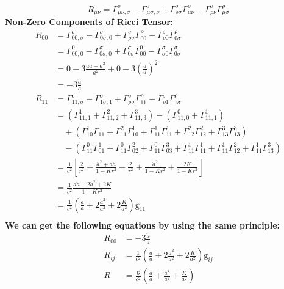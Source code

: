 \documentclass[14pt]{article}
\newcommand{\csg}[2]{\Gamma^{#1}_{#2}}
\newcommand{\csgd}[3]{\Gamma^{#1}_{#2,#3}}
\newcommand{\g}{\mathrm{g}}
\newcommand{\Ricci}[2]{\csgd{\sigma}{#1#2}{\sigma} - \csgd{\sigma}{#1\sigma}{#2} +\csg{\sigma}{\rho \sigma}\csg{\rho}{#1 #2} -\csg{\sigma}{\rho #2}\csg{\rho}{#1\sigma}}
\begin{document}
\[
R_{\mu\nu}  = \Ricci{\mu}{\nu} \tag{1.3.1}
\]
\textbf{Non-Zero Components of Ricci Tensor:}
\begin{align*}
R_{00}  &= \Ricci{0}{0}\\
        &= \csg{0}{00,0} -\csg{\sigma}{0\sigma,0}  +\csg{\sigma}{0\sigma} \csg{0}{00} - \csg{\sigma}{\sigma 0} \csg{\sigma}{0\sigma}\\ 
        &= 0-3\frac{\ddot{a}a-\dot{a}^{2}}{a^{2}}+0-3(\frac{\dot{a}}{a})^{2}\\
        &= -3\frac{\ddot{a}}{a}\tag{1.3.2}\\
R_{11}  &= \Ricci{1}{1}\\
        &= (\csg{1}{11,1}+\csg{2}{11,2}+\csg{3}{11,3})-(\csg{0}{11,0}+\csg{1}{11,1})\\
        &\quad +(\csg{1}{10}\csg{0}{11}+\csg{2}{11}\csg{1}{10}+\csg{1}{11}\csg{1}{11}+\csg{2}{12}\csg{2}{12}+\csg{3}{13}\csg{3}{13})\\
        &\quad -(\csg{0}{11}\csg{1}{01}+\csg{0}{11}\csg{2}{02}+\csg{0}{11}\csg{3}{03}+\csg{1}{11}\csg{1}{11}+\csg{1}{11}\csg{2}{12}+\csg{1}{11}\csg{3}{13})\\
        &=\frac{1}{c^{2}}[\frac{2}{r^{2}}+\frac{\dot{a}^{2}+a\ddot{a}}{1-Kr^{2}}-\frac{2}{r^{2}}+\frac{\dot{a}^{2}}{1-Kr^{2}}+\frac{2K}{1-Kr^{2}}]\\
        &=\frac{1}{c^{2}}\frac{a\ddot{a}+2\dot{a}^{2}+2K}{1-Kr^{2}}\\
        &=\frac{1}{c^{2}}(\frac{\ddot{a}}{a}+2\frac{\dot{a}^{2}}{a^{2}}+2\frac{K}{a^{2}})\g_{11}\tag{1.3.3}\\
\end{align*}
\textbf{We can get the following equations by using the same principle:}
\begin{align*}
R_{00}  &= -3\frac{\ddot{a}}{a}\tag{1.3.4}\\
R_{ij}  &=\frac{1}{c^{2}}(\frac{\ddot{a}}{a}+2\frac{\dot{a}^{2}}{a^{2}}+2\frac{K}{a^{2}})\g_{ij}\tag{1.3.5}\\
R &= \frac{6}{c^{2}}(\frac{\ddot{a}}{a}+\frac{\dot{a}^{2}}{a^{2}}+\frac{K}{a^{2}})\tag{1.3.6}
\end{align*}
\end{document}
